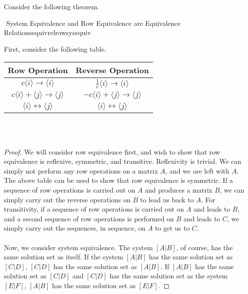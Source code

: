     \pagebreak
    \vphantom
    \\
    \\
    Consider the following theorem.
    \begin{theorem}{\Stop\,\,System Equivalence and Row Equivalence are Equivalence Relations}{equivrelrowsysequiv}
    
        First, consider the following table.
        \begin{center}
            \begin{tabular}{|c|c|}
                \hline
                \hline
                Row Operation & Reverse Operation \\
                \hline
                \hline
                \(c\langle i\rangle \to \langle i\rangle\) & \(\frac{1}{c}\langle i\rangle \to \langle i \rangle\) \\
                \hline
                \(c\langle i \rangle+\langle j \rangle \to\langle j\rangle\) & \(-c\langle i \rangle+\langle j \rangle\to\langle j \rangle\) \\
                \hline
                \(\langle i \rangle \leftrightarrow \langle j \rangle\) & \(\langle i \rangle \leftrightarrow \langle j \rangle\) \\
                \hline
            \end{tabular}
        \end{center}
        \vphantom
        \\
        \\
        \begin{proof}
            We will consider row equivalence first, and wish to show that row equivalence is reflexive, symmetric, and transitive. Reflexivity is trivial. We can simply not perform any row operations on a matrix \(A\), and we are left with \(A\). The above table can be used to show that row equivalence is symmetric. If a sequence of row operations is carried out on \(A\) and produces a matrix \(B\), we can simply carry out the reverse operations on \(B\) to lead us back to \(A\). For transitivity, if a sequence of row operations is carried out on \(A\) and leads to \(B\), and a second sequence of row operations is performed on \(B\) and leads to \(C\), we simply carry out the sequences, in sequence, on \(A\) to get us to \(C\).
            \\
            \\
            Now, we consider system equivalence. The system \([A|B]\), of course, has the same solution set as itself. If the system \([A|B]\) has the same solution set as \([C|D]\), \([C|D]\) has the same solution set as \([A|B]\). If \([A|B]\) has the same solution set as \([C|D]\) and \([C|D]\) has the same solution set as the system \([E|F]\), \([A|B]\) has the same solution set as \([E|F]\).
        \end{proof}
        
    \end{theorem}

